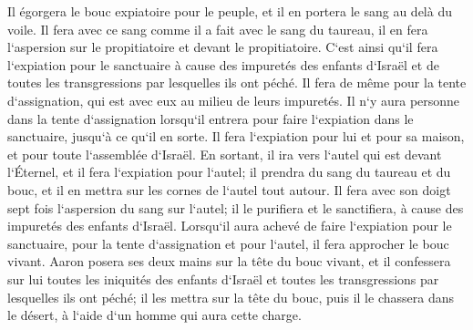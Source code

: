 \verse Il égorgera le bouc expiatoire pour le peuple, et il en portera le sang au delà du voile. Il fera avec ce sang comme il a fait avec le sang du taureau, il en fera l`aspersion sur le propitiatoire et devant le propitiatoire. 
\verse C`est ainsi qu`il fera l`expiation pour le sanctuaire à cause des impuretés des enfants d`Israël et de toutes les transgressions par lesquelles ils ont péché. Il fera de même pour la tente d`assignation, qui est avec eux au milieu de leurs impuretés. 
\verse Il n`y aura personne dans la tente d`assignation lorsqu`il entrera pour faire l`expiation dans le sanctuaire, jusqu`à ce qu`il en sorte. Il fera l`expiation pour lui et pour sa maison, et pour toute l`assemblée d`Israël. 
\verse En sortant, il ira vers l`autel qui est devant l`Éternel, et il fera l`expiation pour l`autel; il prendra du sang du taureau et du bouc, et il en mettra sur les cornes de l`autel tout autour. 
\verse Il fera avec son doigt sept fois l`aspersion du sang sur l`autel; il le purifiera et le sanctifiera, à cause des impuretés des enfants d`Israël. 
\verse Lorsqu`il aura achevé de faire l`expiation pour le sanctuaire, pour la tente d`assignation et pour l`autel, il fera approcher le bouc vivant. 
\verse Aaron posera ses deux mains sur la tête du bouc vivant, et il confessera sur lui toutes les iniquités des enfants d`Israël et toutes les transgressions par lesquelles ils ont péché; il les mettra sur la tête du bouc, puis il le chassera dans le désert, à l`aide d`un homme qui aura cette charge. 
